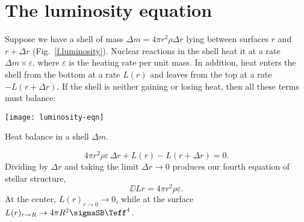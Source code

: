 \section{The luminosity equation}

Suppose we have a shell of mass $\Delta m = 4\pi r^{2}\rho\Delta r$ lying between surfaces $r$ and $r+\Delta r$ (Fig.~\ref{f.luminosity}). Nuclear reactions in the shell heat it at a rate $\Delta m \times \varepsilon$, where $\varepsilon$ is the heating rate per unit mass.  In addition, heat enters the shell from the bottom at a rate $L(r)$ and leaves from the top at a rate $-L(r+\Delta r)$. If the shell is neither gaining or losing heat, then all these terms must balance:
\begin{marginfigure}
\texttt{[image: luminosity-eqn]}
\caption[Heat balance in a mass shell]{Heat balance in a shell $\Delta m$.}
\label{f.luminosity}
\end{marginfigure}
\[ 4\pi r^{2}\rho\varepsilon\,\Delta r + L(r) - L(r+\Delta r) = 0. \]
Dividing by $\Delta r$ and taking the limit $\Delta r \to 0$ produces our fourth equation of stellar structure,
\[
\DD{L}{r} = 4\pi r^{2}\rho\varepsilon.
\]
At the center, $L(r)_{r\to0}\to0$, while at the surface $L(r)_{r\to R}\to 4\pi R^{2}\sigmaSB\Teff^{4}$.



